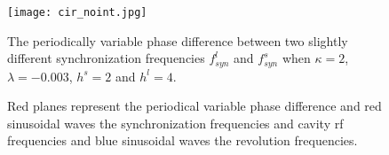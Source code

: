 
\begin{figure}[!htb]
   \centering   
   \texttt{[image: cir\_noint.jpg]}
   \caption{The periodically variable phase difference between two slightly different synchronization frequencies $f_{\mathit{syn}}^{l}$ and $f_{\mathit{syn}}^{s}$ when $\kappa=2$, $\lambda=-0.003$, $h^s=2$ and $h^l=4$.}
	\caption*{Red planes represent the periodical variable phase difference and red sinusoidal waves the synchronization frequencies and cavity rf frequencies and blue sinusoidal waves the revolution frequencies.}
   \label{cir_noint}
\end{figure} 

%

